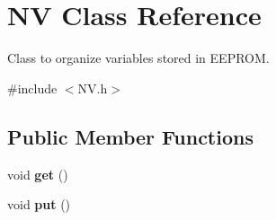 \hypertarget{class_n_v}{}\section{NV Class Reference}
\label{class_n_v}


Class to organize variables stored in E\+E\+P\+R\+OM.  




{\ttfamily \#include $<$N\+V.\+h$>$}

\subsection*{Public Member Functions}
\begin{DoxyCompactItemize}
\item 
\mbox{\label{class_n_v_a738f6d0db4237e12583fc3dd58e4568a}} 
void {\bfseries get} ()
\item 
\mbox{\label{class_n_v_a0e3fa92337806e2ce2ef06e97b053dca}} 
void {\bfseries put} ()
\end{DoxyCompactItemize}
